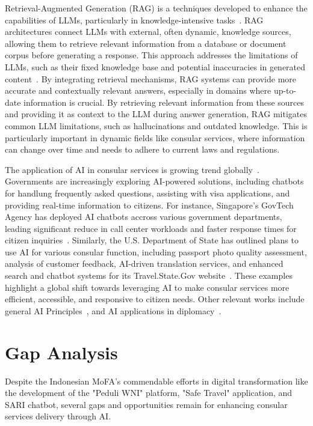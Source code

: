 \documentclass[12pt]{report}
\begin{document}
Retrieval-Augmented Generation (RAG) is a techniques developed to enhance the capabilities of LLMs, particularly in knowledge-intensive tasks~\cite{NEURIPS2020_6b493230}. RAG architectures connect LLMs with external, often dynamic, knowledge sources, allowing them to retrieve relevant information from a database or document corpus before generating a response. This approach addresses the limitations of LLMs, such as their fixed knowledge base and potential inaccuracies in generated content~\cite{gupta2024comprehensivesurveyretrievalaugmentedgeneration}. By integrating retrieval mechanisms, RAG systems can provide more accurate and contextually relevant answers, especially in domains where up-to-date information is crucial.
By retrieving relevant information from these sources and providing it as context to the LLM during answer generation, RAG mitigates common LLM limitations, such as hallucinations and outdated knowledge. This is particularly important in dynamic fields like consular services, where information can change over time and needs to adhere to current laws and regulations.

The application of AI in consular services is growing trend globally~\cite{govnet2025}. Governments are increasingly exploring AI-powered solutions, including chatbots for handlung frequently asked questions, assisting with visa applications, and providing real-time information to citizens. For instance, Singapore's GovTech Agency has deployed AI chatbots accross various government departments, leading significant reduce in call center workloads and faster response times for citizen inquiries~\cite{govsgvica2025}.
Similarly, the U.S. Department of State has outlined  plans to use AI for various consular function, including passport photo quality assessment, analysis of customer feedback, AI-driven translation services, and enhanced search and chatbot systems for its Travel.State.Gov website~\cite{usdosai2025}.
These examples highlight a global shift towards leveraging AI to make consular services more efficient, accessible, and responsive to citizen needs. Other relevant works include general AI Principles~\cite{molaee2025}, and AI applications in diplomacy~\cite{mostafaei2025}.

\section{Gap Analysis}

Despite the Indonesian MoFA's commendable efforts in digital transformation like the development of the "Peduli WNI" platform, "Safe Travel" application, and SARI chatbot, several gaps and opportunities remain for enhancing consular services delivery through AI. 
\end{document}
